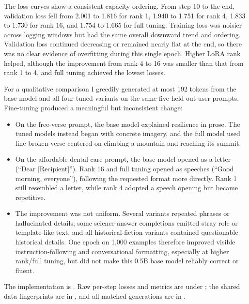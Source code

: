 \documentclass[10pt]{article}
\begin{document}
The loss curves show a consistent capacity ordering.  From step 10 to the end,
validation loss fell from 2.001 to 1.816 for rank 1, 1.940 to 1.751 for rank 4,
1.833 to 1.730 for rank 16, and 1.754 to 1.665 for full tuning.  Training loss
was noisier across logging windows but had the same overall downward trend and
ordering.  Validation loss continued decreasing or remained nearly flat at the
end, so there was no clear evidence of overfitting during this single epoch.
Higher LoRA rank helped, although the improvement from rank 4 to 16 was smaller
than that from rank 1 to 4, and full tuning achieved the lowest losses.

For a qualitative comparison I greedily generated at most 192 tokens from the
base model and all four tuned variants on the same five held-out user prompts.
Fine-tuning produced a meaningful but inconsistent change:
\begin{itemize}
  \item On the free-verse prompt, the base model explained resilience in prose.
  The tuned models instead began with concrete imagery, and the full model used
  line-broken verse centered on climbing a mountain and reaching its summit.
  \item On the affordable-dental-care prompt, the base model opened as a letter
  (``Dear [Recipient]'').  Rank 16 and full tuning opened as speeches (``Good
  morning, everyone''), following the requested format more directly.  Rank 1
  still resembled a letter, while rank 4 adopted a speech opening but became
  repetitive.
  \item The improvement was not uniform.  Several variants repeated phrases or
  hallucinated details; some science-answer completions emitted stray role or
  template-like text, and all historical-fiction variants contained questionable
  historical details.  One epoch on 1,000 examples therefore improved visible
  instruction-following and conversational formatting, especially at higher
  rank/full tuning, but did not make this 0.5B base model reliably correct or
  fluent.
\end{itemize}

The implementation is .  Raw per-step
losses and metrics are under ; the shared
data fingerprints are in ,
and all matched generations are in
.
\end{document}
